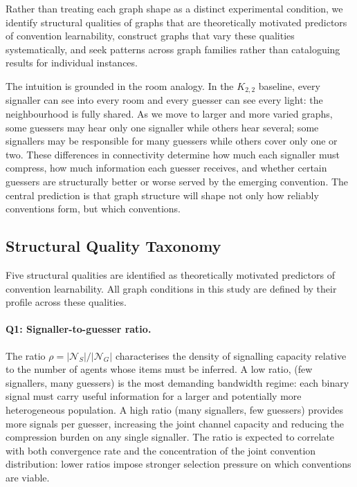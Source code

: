 \documentclass[a4paper,twoside,12pt]{report}
\begin{document}
    Rather than treating each graph shape as a distinct experimental condition, we
    identify structural qualities of graphs that are theoretically motivated
    predictors of convention learnability, construct graphs that vary these
    qualities systematically, and seek patterns across graph families rather than
    cataloguing results for individual instances.
    
    The intuition is grounded in the room analogy. In the $K_{2,2}$ baseline,
    every signaller can see into every room and every guesser can see every light:
    the neighbourhood is fully shared. As we move to larger and more varied graphs,
    some guessers may hear only one signaller while others hear several; some
    signallers may be responsible for many guessers while others cover only one or
    two. These differences in connectivity determine how much each signaller must
    compress, how much information each guesser receives, and whether certain
    guessers are structurally better or worse served by the emerging convention.
    The central prediction is that graph structure will shape not only how reliably
    conventions form, but which conventions.
    
    \subsection{Structural Quality Taxonomy}
    \label{sec:taxonomy}
    
    Five structural qualities are identified as theoretically motivated predictors
    of convention learnability. All graph conditions in this study are defined by
    their profile across these qualities.
    
    \paragraph{Q1: Signaller-to-guesser ratio.}
    The ratio $\rho = |\mathcal{N}_S| / |\mathcal{N}_G|$ characterises the
    density of signalling capacity relative to the number of agents whose items
    must be inferred. A low ratio, (few signallers, many guessers) is the most
    demanding bandwidth regime: each binary signal must carry useful information
    for a larger and potentially more heterogeneous population. A high ratio
    (many signallers, few guessers) provides more signals per guesser, increasing
    the joint channel capacity and reducing the compression burden on any single
    signaller. The ratio is expected to correlate with both convergence rate and
    the concentration of the joint convention distribution: lower ratios impose
    stronger selection pressure on which conventions are viable.
    
\end{document}
